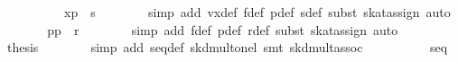 \begin{isabellebody}
\ \ \isamarkupfalse%
\ {}\isanewline
\ \ \ \ \isamarkupfalse%
\ {}x{}{}p{}{}\ {}\ s{}{}\isanewline
\ \ \ \ \ \ \isamarkupfalse%
\ {}simp\ add{}\ vx{}def\ f{}def\ p{}def\ s{}def{}\ subst\ skat{}assign{}{}\ auto{}\isanewline
\ \ \ \ \isamarkupfalse%
\ \isamarkupfalse%
\ {}p{}{}{}p{}{}\ {}\ r{}{}{}\isanewline
\ \ \ \ \ \ \isamarkupfalse%
\ {}simp\ add{}\ f{}def\ p{}def\ r{}def{}\ subst\ skat{}assign{}{}\ auto{}\isanewline
\ \ \ \ \isamarkupfalse%
\ \isamarkupfalse%
\ {}thesis\isanewline
\ \ \ \ \ \ \isamarkupfalse%
\ {}simp\ add{}\ seq{}def\ skd{}mult{}onel{}\ {}smt\ skd{}mult{}assoc{}\isanewline
\ \ \isamarkupfalse%
\isanewline
\isanewline
\ \ \isamarkupfalse%
\ \isamarkupfalse%
\ {}{}{}{}\ {}\ seq\isanewline

\end{isabellebody}
